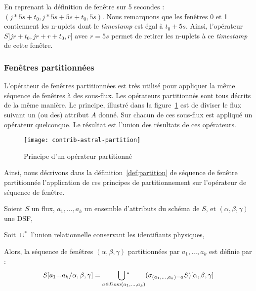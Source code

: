 \begin{example}
    En reprenant la définition de fenêtre sur 5 secondes : $(j*5s+t_0,j*5s+5s+t_0,5s)$. Nous remarquons que les fenêtres 0 et 1 contiennent les n-uplets dont le \textit{timestamp} est égal à $t_0+5s$. Ainsi, l'opérateur $S]jr+t_0,jr+r+t_0,r]$ avec $r=5s$ permet de retirer les n-uplets à ce \textit{timestamp} de cette fenêtre.
\end{example}

\subsubsection{Fenêtres partitionnées}
L'opérateur de fenêtres partitionnées est très utilisé pour appliquer la même séquence de fenêtres à des sous-flux. Les opérateurs partitionnés sont tous décrits de la même manière. Le principe, illustré dans la figure~\ref{fig:contrib:astral:partition} est de diviser le flux suivant un (ou des) attribut $A$ donné. Sur chacun de ces sous-flux est appliqué un opérateur quelconque. Le résultat est l'union des résultats de ces opérateurs.

\begin{figure}[ht]
	\centering
	\texttt{[image: contrib-astral-partition]}
	\caption{Principe d'un opérateur partitionné}\label{fig:contrib:astral:partition}
\end{figure}

Ainsi, nous décrivons dans la définition~\ref{def:partition} de séquence de fenêtre partitionnée l'application de ces principes de partitionnement sur l'opérateur de séquence de fenêtre.
\begin{defi}\label{def:partition}
	Soient $S$ un flux, $a_1,...,a_k$ un ensemble d'attributs du schéma de $S$, et $(\alpha,\beta,\gamma)$ une DSF,
	
	Soit $\cup^*$ l'union relationnelle conservant les identifiants physiques, 

	Alors, la séquence de fenêtres $(\alpha,\beta,\gamma)$ partitionnées par $a_1,...,a_k$ est définie par :
	$$S[a_1...a_k/\alpha,\beta,\gamma] = \mathop{\bigcup\null^*}_{a\in Dom(a_1,...,a_k)} (\sigma_{(a_1,...,a_k)=a} S)[\alpha,\beta,\gamma]$$
\end{defi}

